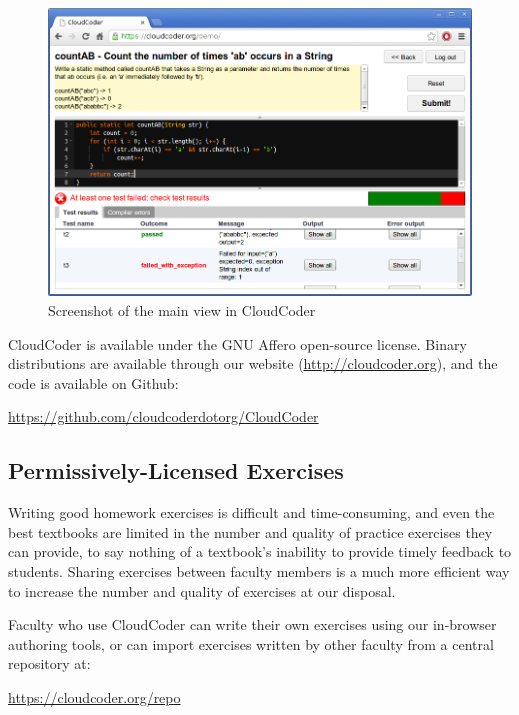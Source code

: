 \documentclass{sig-alternate}
\begin{document}
\begin{figure}[ht]
\centering
\includegraphics[width=5.5in]{images/screenshot4}
\caption{Screenshot of the main view in CloudCoder}
\label{screenshot}
\end{figure}

CloudCoder is available under the GNU Affero open-source license.
Binary distributions are available through our website (\url{http://cloudcoder.org}),
and the code is available on Github:

\vspace*{3mm} 
\url{https://github.com/cloudcoderdotorg/CloudCoder}
\vspace*{3mm}


\subsection{Permissively-Licensed Exercises}

Writing good homework exercises is difficult and
time-consuming, and even the best textbooks are limited in the
number and quality of practice exercises they can provide, to say
nothing of a textbook's inability to provide timely feedback to
students.
Sharing exercises between faculty members is a much
more efficient way to increase the number and quality of exercises at
our disposal.

Faculty who use CloudCoder can write their own exercises using our in-browser
authoring tools, or can import exercises written by other faculty
from a central repository at:

\vspace*{3mm} 
\url{https://cloudcoder.org/repo}
\vspace*{3mm} 
\end{document}
